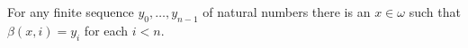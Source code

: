 For any finite sequence $y_0, \ldots, y_{n-1}$ of natural numbers there is an $x \in \omega$ such that $\beta(x, i) = y_i$ for each $i < n$.
